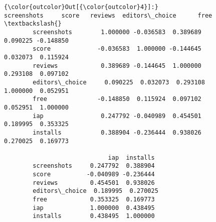 \documentclass[11pt]{article}
\begin{document}
\begin{Verbatim}[commandchars=\\\{\}]
{\color{outcolor}Out[{\color{outcolor}4}]:}                 screenshots     score   reviews  editors\_choice      free  \textbackslash{}
        screenshots        1.000000 -0.036583  0.389689        0.090225 -0.148850   
        score             -0.036583  1.000000 -0.144645        0.032073  0.115924   
        reviews            0.389689 -0.144645  1.000000        0.293108  0.097102   
        editors\_choice     0.090225  0.032073  0.293108        1.000000  0.052951   
        free              -0.148850  0.115924  0.097102        0.052951  1.000000   
        iap                0.247792 -0.040989  0.454501        0.189995  0.353325   
        installs           0.388904 -0.236444  0.938026        0.270025  0.169773   
        
                             iap  installs  
        screenshots     0.247792  0.388904  
        score          -0.040989 -0.236444  
        reviews         0.454501  0.938026  
        editors\_choice  0.189995  0.270025  
        free            0.353325  0.169773  
        iap             1.000000  0.438495  
        installs        0.438495  1.000000  
\end{Verbatim}
            

    
    
    
    
\end{document}

